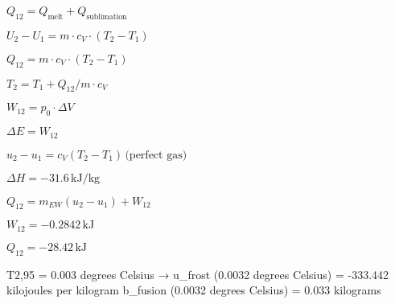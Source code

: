 \( Q_{12} = Q_{\text{melt}} + Q_{\text{sublimation}} \)

\( U_2 - U_1 = m \cdot c_V \cdot (T_2 - T_1) \)

\( Q_{12} = m \cdot c_V \cdot (T_2 - T_1) \)

\( T_2 = T_1 + Q_{12} / m \cdot c_V \)

\( W_{12} = p_{0} \cdot \Delta V \)  

\( \Delta E = W_{12} \)  

\( u_{2} - u_{1} = c_{V} (T_{2} - T_{1}) \, \text{(perfect gas)} \)  

\( \Delta H = - 31.6 \, \text{kJ/kg} \)  

\( Q_{12} = m_{EW} (u_{2} - u_{1}) + W_{12} \)  

\( W_{12} = - 0.2842 \, \text{kJ} \)  

\( Q_{12} = - 28.42 \, \text{kJ} \)

T2,95 = 0.003 degrees Celsius → u_frost (0.0032 degrees Celsius) = -333.442 kilojoules per kilogram  
b_fusion (0.0032 degrees Celsius) = 0.033 kilograms